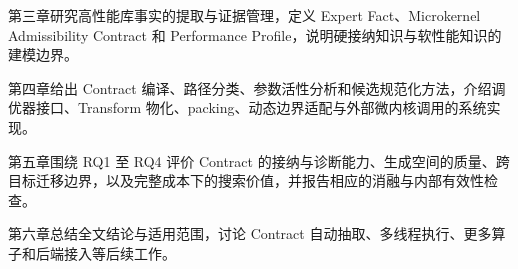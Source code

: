 第三章研究高性能库事实的提取与证据管理，定义 Expert Fact、Microkernel Admissibility Contract 和 Performance Profile，说明硬接纳知识与软性能知识的建模边界。

第四章给出 Contract 编译、路径分类、参数活性分析和候选规范化方法，介绍调优器接口、Transform 物化、packing、动态边界适配与外部微内核调用的系统实现。

第五章围绕 RQ1 至 RQ4 评价 Contract 的接纳与诊断能力、生成空间的质量、跨目标迁移边界，以及完整成本下的搜索价值，并报告相应的消融与内部有效性检查。

第六章总结全文结论与适用范围，讨论 Contract 自动抽取、多线程执行、更多算子和后端接入等后续工作。
